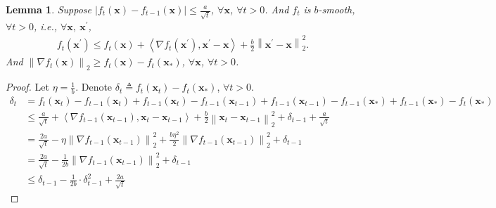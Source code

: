 \documentclass[10pt]{article}
\def\rvx{{\mathbf{x}}}
\newtheorem{lem}{Lemma}
\begin{document}
\begin{lem}
    Suppose $\left| f_t\left(\rvx\right) - f_{t-1}\left(\rvx\right) \right| \le \frac{a}{\sqrt{t}}$, $\forall \rvx$, $\forall t > 0$. And $f_t$ is $b$-smooth, $\forall t > 0$, i.e., $\forall \rvx, \ \rvx^\prime$,
\begin{equation*}
\begin{split}
    f_t\left(\rvx^\prime\right) \le f_t\left(\rvx\right) + \left\langle \nabla f_t\left(\rvx^\prime\right) , \rvx^\prime - \rvx \right\rangle +  \frac{b}{2} \left\| \rvx^\prime - \rvx \right\|_2^2.
\end{split}
\end{equation*}
And $\left\| \nabla f_t\left(\rvx\right) \right\|_2 \ge f_t\left(\rvx\right) - f_t\left(\rvx_*\right)$, $\forall \rvx$, $\forall t > 0$.
\end{lem}
\begin{proof}
Let $\eta = \frac{1}{b}$. Denote $\delta_t \triangleq f_t\left(\rvx_t\right) - f_t\left( \rvx_* \right)$, $\forall t > 0$.
\begin{equation*}
\begin{split}
    \delta_t &= f_t\left(\rvx_t\right) - f_{t-1}\left(\rvx_t\right) + f_{t-1}\left(\rvx_t\right) - f_{t-1}\left(\rvx_{t-1}\right) + f_{t-1}\left(\rvx_{t-1}\right) - f_{t-1}\left( \rvx_* \right) + f_{t-1}\left( \rvx_* \right) -  f_t\left( \rvx_* \right) \\
    &\le \frac{a}{\sqrt{t}} + \left\langle \nabla f_{t-1}\left(\rvx_{t-1}\right),  \rvx_t - \rvx_{t-1} \right\rangle + \frac{b}{2}\left\| \rvx_t - \rvx_{t-1} \right\|_2^2 + \delta_{t-1} + \frac{a}{\sqrt{t}} \\
    &= \frac{2a}{\sqrt{t}} - \eta \left\| \nabla f_{t-1}\left(\rvx_{t-1}\right) \right\|_2^2 + \frac{b \eta^2}{2} \left\| \nabla f_{t-1}\left(\rvx_{t-1}\right)  \right\|_2^2 + \delta_{t-1} \\
    &= \frac{2a}{\sqrt{t}} - \frac{1}{2b} \left\| \nabla f_{t-1}\left(\rvx_{t-1}\right) \right\|_2^2 + \delta_{t-1} \\
    &\le \delta_{t-1} - \frac{1}{2b} \cdot \delta_{t-1}^2 + \frac{2a}{\sqrt{t}}
\end{split}
\end{equation*}
\end{proof}
\end{document}
